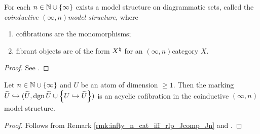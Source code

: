 \begin{prop} \label{prop:model_structre_on_marked_dgm_set}
    For each \( n \in \mathbb{N} \cup \left\{ {\infty} \right\} \) exists a model structure on diagrammatic sets, called the \emph{coinductive \( (\infty, n) \)\nbd model structure}, where
    \begin{enumerate}
        \item cofibrations are the monomorphisms;
        \item fibrant objects are of the form \( {X}^{\natural} \) for an \( (\infty, n) \)\nbd category \( X \).
    \end{enumerate}
\end{prop}
\begin{proof}
    See \cite[3.24, Theorem 4.9]{chanavat2024model}.
\end{proof}

\begin{lem} \label{lem:marked_localisation_acyclic}
    Let \( n \in \mathbb{N} \cup \left\{ {\infty} \right\} \) and \( U \) be an atom of dimension \( \geq 1 \).
    Then the marking \( \widetilde{U} \hookrightarrow (\widetilde{U}, \operatorname{dgn} \widetilde{U} \cup \left\{ {U \hookrightarrow \widetilde{U}} \right\}) \) is an acyclic cofibration in the coinductive \( (\infty, n) \)\nbd model structure.
\end{lem}
\begin{proof}
    Follows from Remark \ref{rmk:infty_n_cat_iff_rlp_Jcomp_Jn} and \cite[Lemma 5.8]{chanavat2025gray}.
\end{proof}

